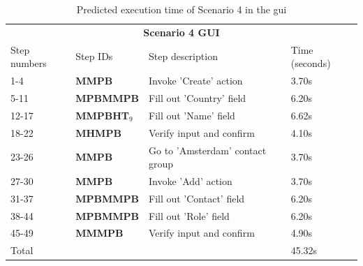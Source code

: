 \begin{table}[H]
	\center
	
	\begin{tabular}{llll}
		\toprule
		\multicolumn{4}{c}{\textbf{Scenario 4 GUI}} \\
		\addlinespace[0.5em]
		Step numbers & Step IDs & Step description & Time (seconds) \\
		\midrule
		1-4 		& \textbf{MMPB}		 				& Invoke 'Create' action 						& 3.70s \\
		5-11		& \textbf{MPBMMPB} 				& Fill out 'Country' field		 				& 6.20s \\
		12-17	& \textbf{MMPBHT$_9$}			& Fill out 'Name' field							& 6.62s \\
		18-22	& \textbf{MHMPB}					& Verify input and confirm					& 4.10s \\
		23-26	& \textbf{MMPB}						& Go to 'Amsterdam' contact group	& 3.70s \\
		27-30	& \textbf{MMPB}						& Invoke 'Add' action							& 3.70s \\
		31-37	& \textbf{MPBMMPB}				& Fill out 'Contact' field						& 6.20s \\
		38-44	& \textbf{MPBMMPB}				& Fill out 'Role' field								& 6.20s \\
		45-49	& \textbf{MMMPB}					& Verify input and confirm					& 4.90s \\
		\midrule
		\multicolumn{3}{l}{Total}																				& 45.32s\\
		\bottomrule
	\end{tabular}

	\caption{Predicted execution time of Scenario 4 in the \acrshort{gui}}
	\label{table:gomsscenario4gui}
\end{table}

